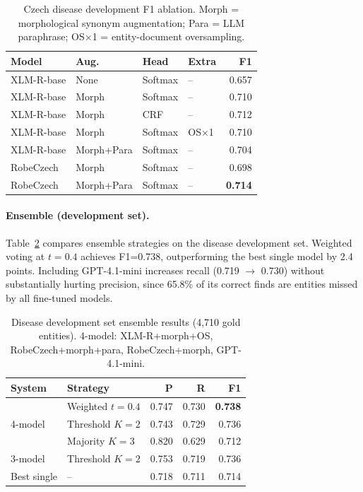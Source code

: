 \documentclass[11pt]{article}
\begin{document}
\begin{table}[h]
\centering
\small
\begin{tabular}{llllr}
\toprule
\textbf{Model} & \textbf{Aug.} & \textbf{Head} & \textbf{Extra} & \textbf{F1} \\
\midrule
XLM-R-base & None       & Softmax & {--}        & 0.657 \\
XLM-R-base & Morph      & Softmax & {--}        & 0.710 \\
XLM-R-base & Morph      & CRF     & {--}        & 0.712 \\
XLM-R-base & Morph      & Softmax & OS$\times$1 & 0.710 \\
XLM-R-base & Morph+Para & Softmax & {--}        & 0.704 \\
RobeCzech  & Morph      & Softmax & {--}        & 0.698 \\
RobeCzech  & Morph+Para & Softmax & {--}        & \textbf{0.714} \\
\bottomrule
\end{tabular}
\caption{Czech disease development F1 ablation. Morph = morphological synonym augmentation;
Para = LLM paraphrase; OS$\times$1 = entity-document oversampling.}
\label{tab:cz-ablation}
\end{table}

\paragraph{Ensemble (development set).}
Table~\ref{tab:cz-ensemble} compares ensemble strategies on the disease development set.
Weighted voting at $t{=}0.4$ achieves F1=0.738, outperforming the best single model by
2.4 points. Including GPT-4.1-mini increases recall (0.719 $\to$ 0.730) without
substantially hurting precision, since 65.8\% of its correct finds are entities missed
by all fine-tuned models.

\begin{table}[h]
\centering
\small
\begin{tabular}{llrrr}
\toprule
\textbf{System} & \textbf{Strategy} & \textbf{P} & \textbf{R} & \textbf{F1} \\
\midrule
\multirow{3}{*}{4-model}
  & Weighted $t{=}0.4$ & 0.747 & 0.730 & \textbf{0.738} \\
  & Threshold $K{=}2$  & 0.743 & 0.729 & 0.736 \\
  & Majority $K{=}3$   & 0.820 & 0.629 & 0.712 \\
3-model & Threshold $K{=}2$  & 0.753 & 0.719 & 0.736 \\
Best single & {--}             & 0.718 & 0.711 & 0.714 \\
\bottomrule
\end{tabular}
\caption{Disease development set ensemble results (4,710 gold entities).
4-model: XLM-R+morph+OS, RobeCzech+morph+para, RobeCzech+morph, GPT-4.1-mini.}
\label{tab:cz-ensemble}
\end{table}
\end{document}
